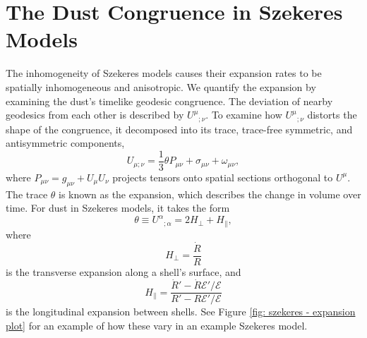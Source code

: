 \documentclass[a4paper,12pt]{report}
\begin{document}
\section{The Dust Congruence in Szekeres Models}
The inhomogeneity of Szekeres models causes their expansion rates to be spatially inhomogeneous and anisotropic. We quantify the expansion by examining the dust's timelike geodesic congruence. The deviation of nearby geodesics from each other is described by ${U^\mu}_{;\nu}$. To examine how ${U^\mu}_{;\nu}$ distorts the shape of the congruence, it decomposed into its trace, trace-free symmetric, and antisymmetric components,
\begin{equation}
  U_{\mu;\nu} = \frac{1}{3}\theta P_{\mu\nu} + \sigma_{\mu\nu} + \omega_{\mu\nu},
\end{equation}
where $P_{\mu\nu} = g_{\mu\nu}  + U_\mu U_\nu$ projects tensors onto spatial sections orthogonal to $U^\mu$. The trace $\theta$ is known as the expansion, which describes the change in volume over time. For dust in Szekeres models, it takes the form
\begin{equation}
  \theta \equiv {U^{\alpha}}_{;\alpha} = 2H_\perp + H_\parallel,
\end{equation}
where
\begin{equation}
  H_\perp = \frac{\dot{R}}{R}
\end{equation}
is the transverse expansion along a shell's surface, and
\begin{equation}
  H_\parallel = \frac{\dot{R}' - \dot{R}\mathcal{E}'/\mathcal{E}}{R'-R\mathcal{E}'/\mathcal{E}}
\end{equation}
is the longitudinal expansion between shells. See Figure \ref{fig: szekeres - expansion plot} for an example of how these vary in an example Szekeres model.
\end{document}

